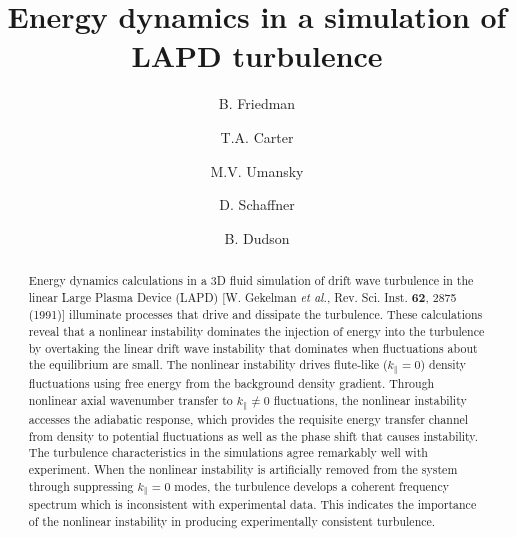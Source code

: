 \documentclass[showpacs,preprintnumbers,amsmath,amssymb,superscriptaddress,aip]{revtex4-1}
\begin{document}
\title{Energy dynamics in a simulation of LAPD turbulence}

\author{B. Friedman}

\author{T.A. Carter}


\author{M.V. Umansky}

\author{D. Schaffner}


\author{B. Dudson}





\begin{abstract}
Energy dynamics calculations in a 3D fluid simulation of drift wave turbulence in the linear Large Plasma Device (LAPD) [W. Gekelman \emph{et al.}, Rev. Sci. Inst. {\bf 62}, 2875 (1991)]
illuminate processes that drive and dissipate the turbulence.
These calculations reveal that a nonlinear instability dominates the injection of energy into the turbulence by overtaking the linear drift
wave instability that dominates when fluctuations about the equilibrium are small.
The nonlinear instability drives flute-like ($k_\parallel = 0$) density fluctuations using free energy from the background density gradient. 
Through nonlinear axial wavenumber transfer to $k_\parallel \ne 0$ fluctuations, the nonlinear instability accesses the adiabatic response, 
which provides the requisite energy transfer channel from density to potential fluctuations as well as the
phase shift that causes instability. The turbulence characteristics in the simulations agree remarkably well with experiment. When the nonlinear instability is artificially 
removed from the system through suppressing $k_\parallel=0$ modes, the turbulence develops a coherent frequency spectrum which is inconsistent
with experimental data. This indicates the importance of the nonlinear instability in producing experimentally consistent turbulence.
\end{abstract}

\maketitle
\end{document}
